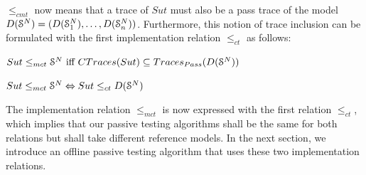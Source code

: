 $\leq_{cmt}$ now means that a trace of $\mathit{Sut}$ must also
be a pass trace of the model
$D(\EuScript{S}^{N})=(D(\EuScript{S}_1^{N}),\dots,D(\EuScript{S}_n^{N}))$.
Furthermore, this notion of trace inclusion can be formulated
with the first implementation relation $\leq_{ct}$ as follows:

\begin{proposition}
	\label{rel:impl2}
${Sut} \leq_{mct} \EuScript{S}^{N} \text{ iff } CTraces({Sut})\subseteq Traces_{Pass}(D(\EuScript{S}^{N}))$

${Sut} \leq_{mct} \EuScript{S}^{N}\Leftrightarrow {Sut} \leq_{ct} D(\EuScript{S}^{N})$

\end{proposition}

The implementation relation $\leq_{mct}$ is now expressed with
the first relation $\leq_{ct}$, which implies that our passive
testing algorithms shall be the same for both relations but shall
take different reference models.
In the next section, we introduce an offline passive testing
algorithm that uses these two implementation relations.

